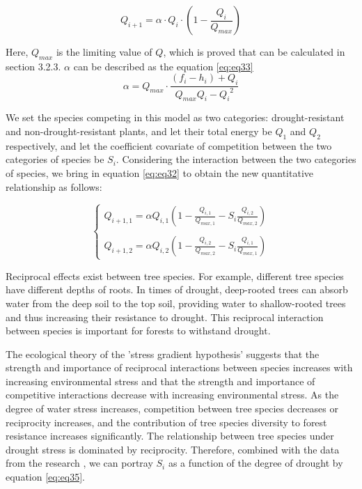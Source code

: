 \documentclass[12pt]{article}  %
\newenvironment{shrinkeq}[1]
{ \bgroup
	\addtolength\abovedisplayshortskip{#1}
	\addtolength\abovedisplayskip{#1}
	\addtolength\belowdisplayshortskip{#1}
	\addtolength\belowdisplayskip{#1}}
{\egroup\ignorespacesafterend}
\begin{document}
\vspace{-0.2cm}
\begin{shrinkeq}{-1ex}
	\begin{equation}
    \label{eq:eq32}
	  Q_{i+1}=\alpha \cdot Q_{i}\cdot(1-\frac{Q_i}{Q_{max}})
	\end{equation}
\end{shrinkeq}

Here, $Q_{max}$ is the limiting value of $Q$, which is proved that can be calculated in section 3.2.3. $\alpha$ can be described as the equation \eqref{eq:eq33}
\begin{shrinkeq}{-1ex}
	\begin{equation}
    \label{eq:eq33}
	  \alpha= Q_{max} \cdot \frac{(f_{i}-h_{i}) + Q_{i}}{Q_{max}Q_{i}-{Q_{i}}^2}
	\end{equation}
\end{shrinkeq}

We set the species competing in this model as two categories: drought-resistant and non-drought-resistant plants, and let their total energy be $Q_1$ and $Q_2$ respectively, and let the coefficient covariate of competition between the two categories of species be $S_i$. Considering the interaction between the two categories of species, we bring in equation \eqref{eq:eq32} to obtain the new quantitative relationship as follows:

\begin{shrinkeq}{-1ex}
	\begin{equation}
    \label{eq:eq34}
	\left\{\begin{array}{l}
     Q_{i+1,1}=\alpha Q_{i,1}(1-\frac{Q_{i,1}}{Q_{max,1}}-S_i\frac{Q_{i,2}}{Q_{max,2}})\\
     \\
    Q_{i+1,2}=\alpha Q_{i,2}(1-\frac{Q_{i,2}}{Q_{max,2}}-S_i\frac{Q_{i,1}}{Q_{max,1}})
    \end{array}\right.
	\end{equation}
\end{shrinkeq}

\vspace{0.2cm}
Reciprocal effects exist between tree species. For example, different tree species have different depths of roots. In times of drought, deep-rooted trees can absorb water from the deep soil to the top soil, providing water to shallow-rooted trees and thus increasing their resistance to drought. This reciprocal interaction between species is important for forests to withstand drought. 

The ecological theory of the 'stress gradient hypothesis' suggests that the strength and importance of reciprocal interactions between species increases with increasing environmental stress and that the strength and importance of competitive interactions decrease with increasing environmental stress. As the degree of water stress increases, competition between tree species decreases or reciprocity increases, and the contribution of tree species diversity to forest resistance increases significantly. The relationship between tree species under drought stress is dominated by reciprocity.
Therefore, combined with the data from the research {\cite{16}}, we can portray $S_i$ as a function of the degree of drought by equation \eqref{eq:eq35}.
\end{document}
